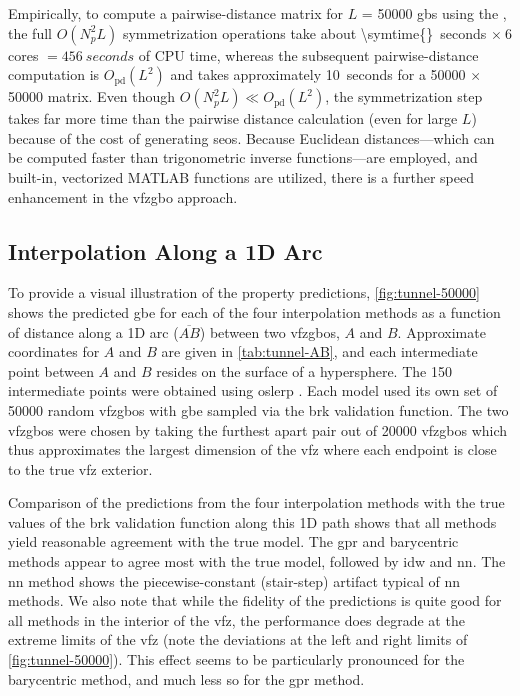 \documentclass[final,twocolumn,12pt]{elsarticle}
\begin{document}
Empirically, to compute a pairwise-distance matrix for $L$ = \num{50000} \glspl{gb} using the \vfzorepo{} \cite{bairdFiveDegreeofFreedom5DOF2020}, the full $O(N_p^2L)$ symmetrization operations take about \SI{\symtime{}}{seconds} $\times\ 6$ cores $= \SI{456}{seconds}$ of CPU time, whereas the subsequent pairwise-distance computation is $O_{\text{pd}}(L^2)$ and takes approximately \SI{10}{seconds} for a \num{50000} $\times$ \num{50000} matrix. Even though $O(N_p^2L) \ll O_{\text{pd}}(L^2)$, the symmetrization step takes far more time than the pairwise distance calculation (even for large $L$) because of the cost of generating \glspl{seo}. Because Euclidean distances---which can be computed faster than trigonometric inverse functions---are employed, and built-in, vectorized MATLAB functions are utilized, there is a further speed enhancement in the \gls{vfzgbo} approach. %

\subsection{Interpolation Along a 1D Arc}
\label{sec:results:vis:arc}
%
To provide a visual illustration of the property predictions, \cref{fig:tunnel-50000} shows the predicted \gls{gbe} for each of the four interpolation methods as a function of distance along a 1D arc ($\overline{AB}$) between two \glspl{vfzgbo}, $A$ and $B$. Approximate coordinates for $A$ and $B$ are given in \cref{tab:tunnel-AB}, and each intermediate point between $A$ and $B$ resides on the surface of a hypersphere. The \num{150} intermediate points were obtained using \gls{oslerp} \cite{francisGeodesicOctonionMetric2019}. Each model used its own set of \num{50000} random \inpt{} \glspl{vfzgbo} with \gls{gbe} sampled via the \gls{brk} validation function. The two \glspl{vfzgbo} were chosen by taking the furthest apart pair out of \num{20000} \glspl{vfzgbo} which thus approximates the largest dimension of the \gls{vfz} where each endpoint is close to the true \gls{vfz} exterior.

Comparison of the predictions from the four interpolation methods with the true values of the \gls{brk} validation function along this 1D path shows that all methods yield reasonable agreement with the true model. The \gls{gpr} and barycentric methods appear to agree most with the true model, followed by \gls{idw} and \gls{nn}. The \gls{nn} method shows the piecewise-constant (stair-step) artifact typical of \gls{nn} methods. We also note that while the fidelity of the predictions is quite good for all methods in the interior of the \gls{vfz}, the performance does degrade at the extreme limits of the \gls{vfz} (note the deviations at the left and right limits of \cref{fig:tunnel-50000}). This effect seems to be particularly pronounced for the barycentric method, and much less so for the \gls{gpr} method.
\end{document}
